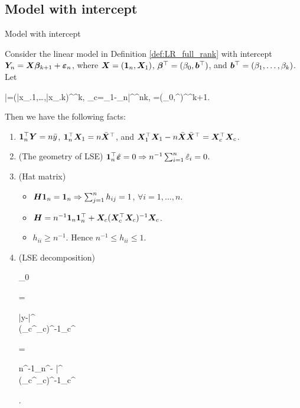 \documentclass[10pt,a4paper]{book}
\begin{document}
\subsection{Model with intercept}\label{sec:LR_full_rank_intercept}
\begin{thmbox}{Model with intercept}
	\begin{proposition}\label{prop:LR_full_rank_intercept}
		Consider the linear model in Definition \ref{def:LR_full_rank} with intercept ${\boldsymbol Y}_{n}={\boldsymbol X}{\boldsymbol\beta}_{k+1}+{\boldsymbol\varepsilon}_n$, where ${\boldsymbol X}=({\boldsymbol 1}_n,{\boldsymbol X}_1)$, ${\boldsymbol\beta}^\top=(\beta_0,{\boldsymbol b}^\top)$, and ${\boldsymbol b}^\top=(\beta_1,\ldots,\beta_k)$.
		Let 
		\begin{sequation*}
			\bar{\X}=(\bar{x}_{.1},\ldots,\bar{x}_{.k})^\TT\in\bbR^k, \quad \X_c=\X_1-\1_n\bar{\X}^\TT\in\bbR^{n\times k}, \quad \hat{\bab}=(\hat{\beta}_0,\hat{\b}^\TT)^\TT\in\bbR^{k+1}.
		\end{sequation*} 
		Then we have the following facts:
		\begin{enumerate}
			\item ${\boldsymbol 1}_n^\top {\boldsymbol Y}=n\bar{y}$, ${\boldsymbol 1}_n^\top {\boldsymbol X}_1=n\bar{{\boldsymbol X}}^\top$, and ${\boldsymbol X}_1^\top{\boldsymbol X}_1-n\bar{{\boldsymbol X}}\bar{{\boldsymbol X}}^\top={\boldsymbol X}_c^\top{\boldsymbol X}_c$. 
			\item (The geometry of LSE)  ${\boldsymbol 1}_n^\top \hat{{\boldsymbol\varepsilon}}=0 \Rightarrow n^{-1}\sum_{i=1}^{n}\hat{\varepsilon}_i=0$.
			\item (Hat matrix) 
			\begin{itemize}
				\item ${\boldsymbol H}{\boldsymbol 1}_n={\boldsymbol 1}_n\Rightarrow \sum_{j=1}^{n}h_{ij}=1$, $\forall i=1,\ldots,n$.
				\item ${\boldsymbol H}=n^{-1}{\boldsymbol 1}_n{\boldsymbol 1}_n^\top+{\boldsymbol X}_c({\boldsymbol X}_c^\top{\boldsymbol X}_c)^{-1}{\boldsymbol X}_c$.
				\item $h_{ii}\geq n^{-1}$. Hence $n^{-1}\leq h_{ii}\leq 1$.   
			\end{itemize}  
			\item (LSE decomposition)
			\begin{sequation*}
				\begin{pmatrix}
					\hat{\beta}_0 \\ \hat{\b}
				\end{pmatrix} = \begin{bmatrix}
					\bar{y}-\bar{\X}^\TT\hat{\b} \\ (\X_c^\TT\X_c)^{-1}\X_c^\TT\Y
				\end{bmatrix} = 
				\begin{bmatrix}
					n^{-1}\1_n^\TT \Y - \bar{\X}^\TT \hat{\b} \\ (\X_c^\TT\X_c)^{-1}\X_c^\TT\Y
				\end{bmatrix}.

\end{sequation*}
\end{enumerate}
\end{proposition}
\end{thmbox}
\end{document}

